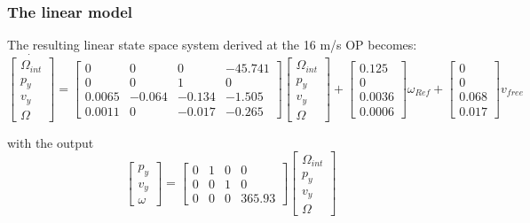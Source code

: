 \subsubsection{The linear model} \label{sec:linear_model}
The resulting linear state space system derived at the 16 m/s OP becomes:
\begin{equation}\label{eq:xdot}
	\dot{\begin{bmatrix} \Omega_{int} \\
						p_y \\ 
						v_y \\
						\Omega \end{bmatrix}} = 
	\begin{bmatrix} 0       &  0        & 0 		& -45.741	\\
					0       &  0   		& 1    		& 0			\\
					0.0065  & -0.064	& -0.134	& -1.505	\\
					0.0011  &       0  	& -0.017	& -0.265\end{bmatrix}
	\begin{bmatrix} \Omega_{int} \\
					p_y \\ 
					v_y \\
					\Omega \end{bmatrix} + 
	\begin{bmatrix} 0.125 	\\
					0		\\
					0.0036	\\
					0.0006\end{bmatrix} \omega_{Ref} + 
	\begin{bmatrix} 0	\\
					0		\\
					0.068 	\\
					0.017 \end{bmatrix} v_{free}
\end{equation}

\smallskip
\noindent with the output
\begin{equation}\label{eq:y}
	\begin{bmatrix} p_y \\
					v_y \\
					\omega \end{bmatrix} = 
	\begin{bmatrix}	0  	& 1 	& 0  	& 0	\\
					0  	& 0  	& 1 	& 0			\\
					0	& 0 	& 0 	& 365.93 \end{bmatrix}
	\begin{bmatrix} \Omega_{int} \\
					p_y \\ 
					v_y \\
					\Omega \end{bmatrix}
\end{equation}



